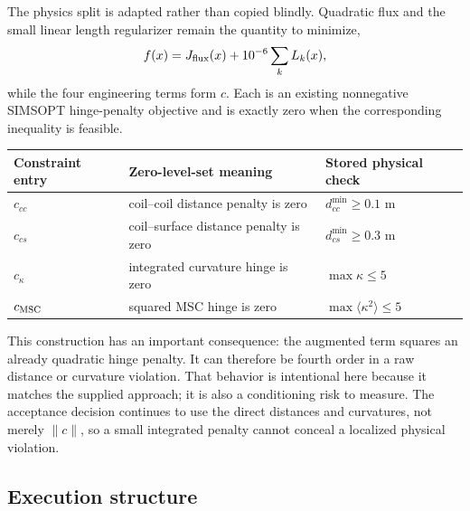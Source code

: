\documentclass[11pt,a4paper]{article}
\begin{document}
The physics split is adapted rather than copied blindly.  Quadratic flux and
the small linear length regularizer remain the quantity to minimize,
\[
  f(x)=J_{\rm flux}(x)+10^{-6}\sum_k L_k(x),
\]
while the four engineering terms form $c$.  Each is an existing nonnegative
SIMSOPT hinge-penalty objective and is exactly zero when the corresponding
inequality is feasible.

\begin{center}
\begin{tabular}{lll}
\toprule
Constraint entry & Zero-level-set meaning & Stored physical check \\
\midrule
$c_{cc}$ & coil--coil distance penalty is zero & $d_{cc}^{\min}\geq0.1$ m \\
$c_{cs}$ & coil--surface distance penalty is zero & $d_{cs}^{\min}\geq0.3$ m \\
$c_{\kappa}$ & integrated curvature hinge is zero & $\max\kappa\leq5$ \\
$c_{\rm MSC}$ & squared MSC hinge is zero & $\max\langle\kappa^2\rangle\leq5$ \\
\bottomrule
\end{tabular}
\end{center}

This construction has an important consequence: the augmented term squares an
already quadratic hinge penalty.  It can therefore be fourth order in a raw
distance or curvature violation.  That behavior is intentional here because
it matches the supplied approach; it is also a conditioning risk to measure.
The acceptance decision continues to use the direct distances and curvatures,
not merely $\lVert c\rVert$, so a small integrated penalty cannot conceal a
localized physical violation.

\subsection{Execution structure}
\end{document}
